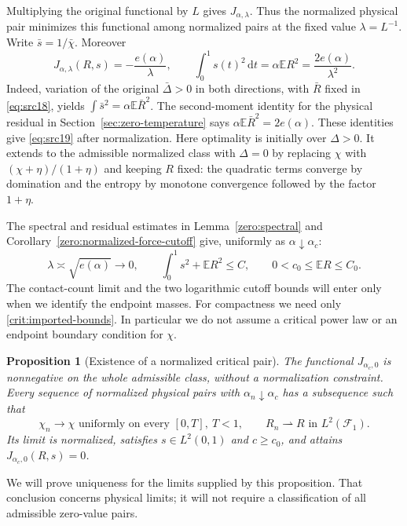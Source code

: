 \documentclass[11pt,a4paper]{article}
\numberwithin{equation}{section}
\newtheorem{proposition}[theorem]{Proposition}
\theoremstyle{definition}
\theoremstyle{remark}
\newcommand{\E}{\mathbb E}
\newcommand{\dd}{\mathrm d}
\begin{document}
Multiplying the original functional by $L$ gives
$J_{\alpha,\lambda}$. Thus the normalized physical pair minimizes this
functional among normalized pairs at the fixed value $\lambda=L^{-1}$.
Write $\bar s=1/\bar\chi$. Moreover
\begin{equation}\label{eq:src19}
 J_{\alpha,\lambda}(R,s)=-\frac{e(\alpha)}\lambda,
 \qquad \int_0^1s(t)^2\,\dd t
            =\alpha\E R^2=\frac{2e(\alpha)}{\lambda^2}.
\end{equation}
Indeed, variation of the original $\bar\Delta>0$ in both directions, with
$\bar R$ fixed in \eqref{eq:src18}, yields
$\int\bar s^2=\alpha\E\bar R^2$.  The second-moment identity for the
physical residual in Section~\ref{sec:zero-temperature} says
$\alpha\E\bar R^2=2e(\alpha)$.  These identities give
\eqref{eq:src19} after normalization.
Here optimality is initially over $\Delta>0$.  It extends to the
admissible normalized class with $\Delta=0$ by replacing $\chi$ with
$(\chi+\eta)/(1+\eta)$ and keeping $R$ fixed: the quadratic terms converge
by domination and the entropy by monotone convergence followed by the
factor $1+\eta$.

The spectral and residual estimates in
Lemma~\ref{zero:spectral} and
Corollary~\ref{zero:normalized-force-cutoff} give, uniformly as
$\alpha\downarrow\alpha_c$:
\begin{equation}\label{crit:imported-bounds}
 \lambda\asymp\sqrt{e(\alpha)}\longrightarrow0,
 \qquad \int_0^1s^2+\E R^2\le C,
 \qquad 0<c_0\le\E R\le C_0.
\end{equation}
The contact-count limit and the two logarithmic cutoff bounds will enter
only when we identify the endpoint masses. For compactness we need only
\eqref{crit:imported-bounds}. In particular we do not assume a critical
power law or an endpoint boundary condition for $\chi$.

\begin{proposition}[Existence of a normalized critical pair]
\label{crit:compactness}
The functional $J_{\alpha_c,0}$ is nonnegative on the whole admissible
class, without a normalization constraint. Every sequence of normalized physical
pairs with $\alpha_n\downarrow\alpha_c$ has a subsequence such that
\[
 \chi_n\to\chi\text{ uniformly on every }[0,T],\ T<1,
 \qquad R_n\rightharpoonup R\text{ in }L^2(\mathcal F_1).
\]
Its limit is normalized, satisfies $s\in L^2(0,1)$ and $c\ge c_0$, and
attains $J_{\alpha_c,0}(R,s)=0$.
\end{proposition}

We will prove uniqueness for the limits supplied by this proposition.
That conclusion concerns physical limits; it will not require a
classification of all admissible zero-value pairs.
\end{document}
